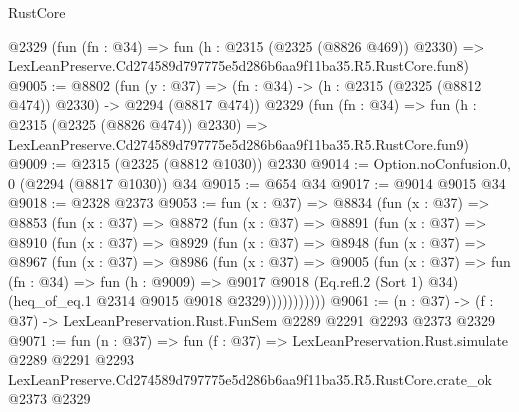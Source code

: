 \begin{lexlean}{RustCore}
\begin{coremodule}
    @2329
    (fun (fn : @34) =>
    fun (h : @2315 (@2325 (@8826 @469)) @2330) =>
    LexLeanPreserve.Cd274589d797775e5d286b6aa9f11ba35.R5.RustCore.fun8)
@9005 := @8802
    (fun (y : @37) => (fn : @34) -> (h : @2315 (@2325 (@8812 @474)) @2330) -> @2294 (@8817 @474))
    @2329
    (fun (fn : @34) =>
    fun (h : @2315 (@2325 (@8826 @474)) @2330) =>
    LexLeanPreserve.Cd274589d797775e5d286b6aa9f11ba35.R5.RustCore.fun9)
@9009 := @2315 (@2325 (@8812 @1030)) @2330
@9014 := Option.noConfusion.{0, 0} (@2294 (@8817 @1030)) @34
@9015 := @654 @34
@9017 := @9014 @9015 @34
@9018 := @2328 @2373
@9053 := fun (x : @37) =>
  @8834
    (fun (x : @37) =>
    @8853
      (fun (x : @37) =>
      @8872
        (fun (x : @37) =>
        @8891
          (fun (x : @37) =>
          @8910
            (fun (x : @37) =>
            @8929
              (fun (x : @37) =>
              @8948
                (fun (x : @37) =>
                @8967
                  (fun (x : @37) =>
                  @8986
                    (fun (x : @37) =>
                    @9005
                      (fun (x : @37) =>
                      fun (fn : @34) =>
                      fun (h : @9009) =>
                      @9017
                        @9018
                        (Eq.refl.{2} (Sort 1) @34)
                        (heq_of_eq.{1} @2314 @9015 @9018 @2329)))))))))))
@9061 := (n : @37) -> (f : @37) -> LexLeanPreservation.Rust.FunSem @2289 @2291 @2293 @2373 @2329
@9071 := fun (n : @37) =>
  fun (f : @37) =>
  LexLeanPreservation.Rust.simulate
    @2289
    @2291
    @2293
    LexLeanPreserve.Cd274589d797775e5d286b6aa9f11ba35.R5.RustCore.crate_ok
    @2373
    @2329
\end{coremodule}
\end{lexlean}
